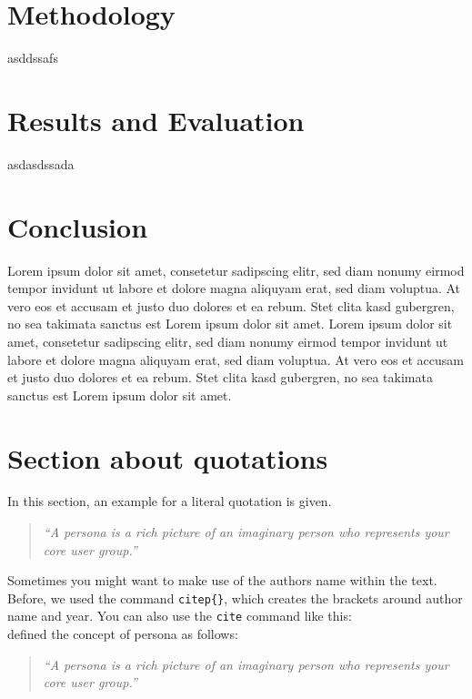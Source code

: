 \documentclass[a4paper]{article}
\begin{document}
\section{Methodology} %
\label{sec:methodology}
asddssafs

\section{Results and Evaluation} %
\label{sec:evaluation}
asdasdssada

\section{Conclusion} %
\label{sec:conclusion}
Lorem ipsum dolor sit amet, consetetur sadipscing elitr, sed diam nonumy eirmod tempor invidunt ut labore et dolore magna aliquyam erat, sed diam voluptua. At vero eos et accusam et justo duo dolores et ea rebum. Stet clita kasd gubergren, no sea takimata sanctus est Lorem ipsum dolor sit amet. Lorem ipsum dolor sit amet, consetetur sadipscing elitr, sed diam nonumy eirmod tempor invidunt ut labore et dolore magna aliquyam erat, sed diam voluptua. At vero eos et accusam et justo duo dolores et ea rebum. Stet clita kasd gubergren, no sea takimata sanctus est Lorem ipsum dolor sit amet.

\section{Section about quotations} %
\label{sec:section_about_quotations}

In this section, an example for a literal quotation is given. 

\begin{quotation}
	\emph{``A persona is a rich picture of an imaginary person who represents your core user group.''}
	\citep{CraftBaekEtAl}
\end{quotation}

Sometimes you might want to make use of the authors name within the text. Before, we used the command \texttt{citep\{\}}, which creates the brackets around author name and year. You can also use the \texttt{cite} command like this: \\

\cite{Dix04} defined the concept of persona as follows: 
\begin{quotation}
	\emph{``A persona is a rich picture of an imaginary person who represents your core user group.''}
	\citep{EastZhouEtAl}
\end{quotation}
\end{document}
